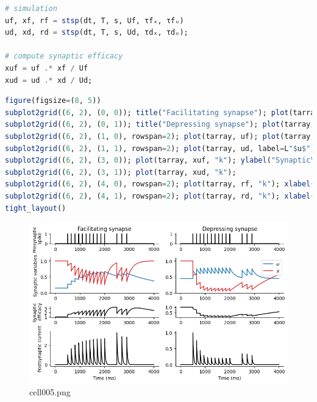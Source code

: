 \begin{lstlisting}[language=julia]
# simulation
uf, xf, rf = stsp(dt, T, s, Uf, τfₓ, τfᵤ)
ud, xd, rd = stsp(dt, T, s, Ud, τdₓ, τdᵤ);

# compute synaptic efficacy
xuf = uf .* xf / Uf 
xud = ud .* xd / Ud; 
\end{lstlisting}
\begin{lstlisting}[language=julia]
figure(figsize=(8, 5))
subplot2grid((6, 2), (0, 0)); title("Facilitating synapse"); plot(tarray, s, "k"); ylabel("Presynaptic\n spike");
subplot2grid((6, 2), (0, 1)); title("Depressing synapse"); plot(tarray, s, "k");
subplot2grid((6, 2), (1, 0), rowspan=2); plot(tarray, uf); plot(tarray, xf, "tab:red"); ylabel("Synaptic variables"); ylim(0, 1.1); 
subplot2grid((6, 2), (1, 1), rowspan=2); plot(tarray, ud, label=L"$u$"); plot(tarray, xd, "tab:red", label=L"$x$"); ylim(0, 1.1); legend()
subplot2grid((6, 2), (3, 0)); plot(tarray, xuf, "k"); ylabel("Synaptic\n efficacy")
subplot2grid((6, 2), (3, 1)); plot(tarray, xud, "k"); 
subplot2grid((6, 2), (4, 0), rowspan=2); plot(tarray, rf, "k"); xlabel("Time (ms)"); ylabel("Postsynaptic current")
subplot2grid((6, 2), (4, 1), rowspan=2); plot(tarray, rd, "k"); xlabel("Time (ms)")
tight_layout()
\end{lstlisting}
\begin{figure}[ht]
	\centering
	\includegraphics[scale=0.8, max width=\linewidth]{./fig/synapse-model/dynamical-synapses/cell005.png}
	\caption{cell005.png}
	\label{cell005.png}
\end{figure}
